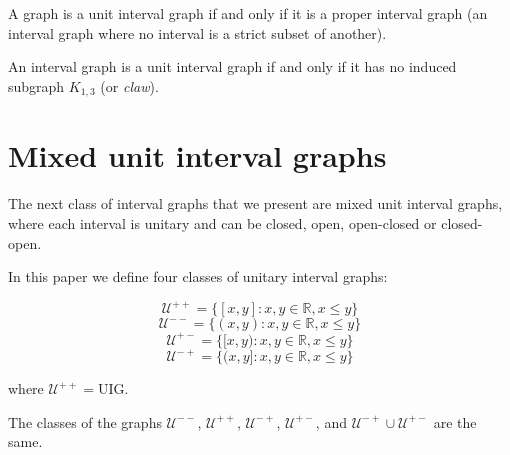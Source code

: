 \begin{theorem}
  A graph is a unit interval graph if and only if it is a proper interval graph (an interval graph where no interval is a strict subset of another).
\end{theorem}

\begin{theorem}
  \label{theo:k_13}
  An interval graph is a unit interval graph if and only if it has no induced subgraph $K_{1,3}$ (or \emph{claw}).
\end{theorem}

\section{Mixed unit interval graphs}
\label{sec:muig}

The next class of interval graphs that we present are mixed unit interval graphs, where each
interval is unitary and can be closed, open, open-closed or closed-open.

In this paper we define four classes of unitary interval graphs:

$$\mathcal{U}^{++} = \{[x,y] : x,y \in \mathbb{R}, x\leq y\}$$
$$\mathcal{U}^{--} = \{(x,y) : x,y \in \mathbb{R}, x\leq y\}$$
$$\mathcal{U}^{+-} = \{[x,y) : x,y \in \mathbb{R}, x\leq y\}$$
$$\mathcal{U}^{-+} = \{(x,y] : x,y \in \mathbb{R}, x\leq y\}$$

where $\mathcal{U}^{++} = \text{UIG}$.
\begin{theorem}
  The classes of the graphs $\mathcal{U}^{--}$, $\mathcal{U}^{++}$,
  $\mathcal{U}^{-+}$, $\mathcal{U}^{+-}$, and  $\mathcal{U}^{-+} \cup
  \mathcal{U}^{+-}$ are the same.
\end{theorem}

